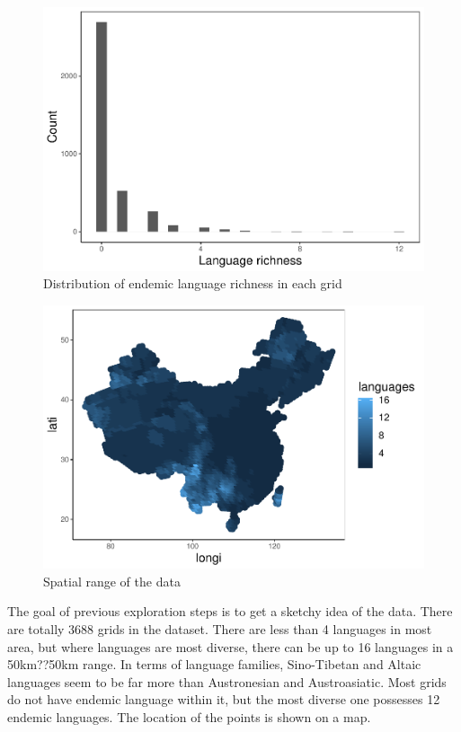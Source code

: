 \documentclass[12pt,]{article}
\begin{document}
\begin{figure}
\centering
\includegraphics{Project_Template_files/figure-latex/unnamed-chunk-3-1.pdf}
\caption{Distribution of endemic language richness in each grid}
\end{figure}

\begin{figure}
\centering
\includegraphics{Project_Template_files/figure-latex/unnamed-chunk-4-1.pdf}
\caption{Spatial range of the data}
\end{figure}

The goal of previous exploration steps is to get a sketchy idea of the
data. There are totally 3688 grids in the dataset. There are less than 4
languages in most area, but where languages are most diverse, there can
be up to 16 languages in a 50km??50km range. In terms of language
families, Sino-Tibetan and Altaic languages seem to be far more than
Austronesian and Austroasiatic. Most grids do not have endemic language
within it, but the most diverse one possesses 12 endemic languages. The
location of the points is shown on a map.
\end{document}
